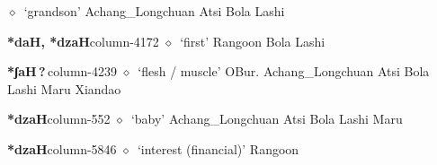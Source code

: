 \hspace{1ex}
         $\diamond$~`grandson'
         Achang\_Longchuan 
\hspace{1ex}
         Atsi 
\hspace{1ex}
         Bola 
\hspace{1ex}
         Lashi 
  \item {\footnotesize \textbf{*daH, *dzaH}}{\tiny column-4172}
         $\diamond$~`first'
         Rangoon 
\hspace{1ex}
         Bola 
\hspace{1ex}
         Lashi 
  \item {\footnotesize \textbf{*ʃaH\,?\,}}{\tiny column-4239}
         $\diamond$~`flesh / muscle'
         OBur. 
\hspace{1ex}
         Achang\_Longchuan 
\hspace{1ex}
         Atsi 
\hspace{1ex}
         Bola 
\hspace{1ex}
         Lashi 
\hspace{1ex}
         Maru 
\hspace{1ex}
         Xiandao 
  \item {\footnotesize \textbf{*dzaH}}{\tiny column-552}
         $\diamond$~`baby'
         Achang\_Longchuan 
\hspace{1ex}
         Atsi 
\hspace{1ex}
         Bola 
\hspace{1ex}
         Lashi 
\hspace{1ex}
         Maru 
  \item {\footnotesize \textbf{*dzaH}}{\tiny column-5846}
         $\diamond$~`interest (financial)'
         Rangoon 
